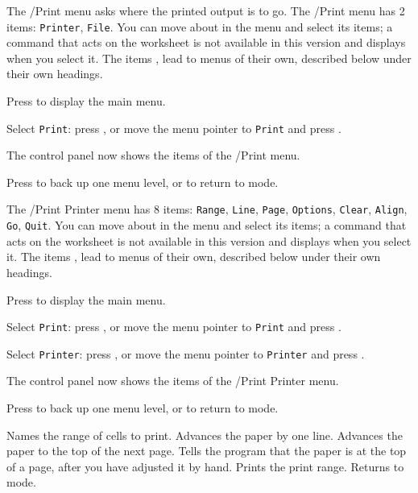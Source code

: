 The /Print menu asks where the printed output is to go.  The /Print menu has 2 items: \texttt{Printer}, \texttt{File}.  You can move about in the menu and select its items; a command that acts on the worksheet is not available in this version and displays  when you select it.
The items ,  lead to menus of their own, described below under their own headings.
\begin{Steps123}
\item Press  to display the main menu.
\item Select \texttt{Print}: press , or move the menu pointer to \texttt{Print} and press .
\item The control panel now shows the items of the /Print menu.
\item Press  to back up one menu level, or  to return to  mode.
\end{Steps123}

The /Print Printer menu has 8 items: \texttt{Range}, \texttt{Line}, \texttt{Page}, \texttt{Options}, \texttt{Clear}, \texttt{Align}, \texttt{Go}, \texttt{Quit}.  You can move about in the menu and select its items; a command that acts on the worksheet is not available in this version and displays  when you select it.
The items ,  lead to menus of their own, described below under their own headings.
\begin{Steps123}
\item Press  to display the main menu.
\item Select \texttt{Print}: press , or move the menu pointer to \texttt{Print} and press .
\item Select \texttt{Printer}: press , or move the menu pointer to \texttt{Printer} and press .
\item The control panel now shows the items of the /Print Printer menu.
\item Press  to back up one menu level, or  to return to  mode.
\end{Steps123}
\begin{Options}
 Names the range of cells to print.
 Advances the paper by one line.
 Advances the paper to the top of the next page.
 Tells the program that the paper is at the top of a page, after you have adjusted it by hand.
 Prints the print range.
 Returns to  mode.
\end{Options}

